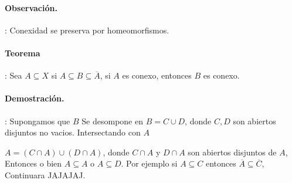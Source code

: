 \paragraph{\textbf{Observación.}}: Conexidad se preserva  por homeomorfismos.

\paragraph{\textbf{Teorema}}: Sea $A \subseteq X$ si $A\subseteq B \subseteq \overline A$, si $A$ es conexo, entonces $B$ es conexo.

\paragraph{\textbf{Demostración.}}: Supongamos que $B$ Se desompone en $B = C \cup D$, donde $C,D$ son abiertos disjuntos no vacios. Intersectando con $A$

$A = (C \cap A) \cup (D \cap A)$, donde $C \cap A$ y $D \cap A$ son abiertos disjuntos de $A$, Entonces o bien $A\subseteq A$ o $A\subseteq D$. Por ejemplo si $A \subseteq C$ entonces $\overline A \subseteq \overline C$, Continuara JAJAJAJ.
